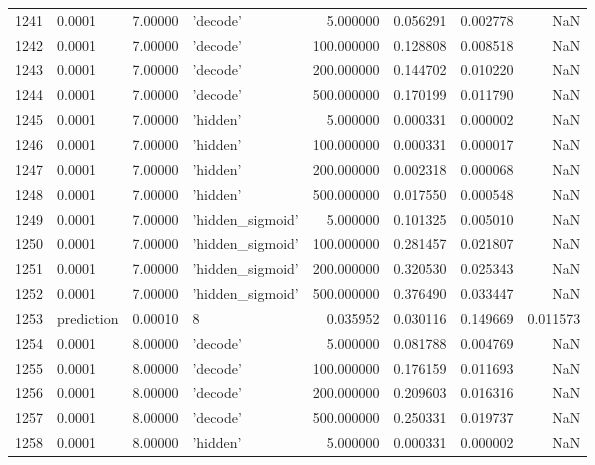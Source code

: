\documentclass[10pt,a4paper]{article}
\begin{document}
\begin{tabular}{llrlrrrr}
1241 &      0.0001 &   7.00000 &           'decode' &    5.000000 &  0.056291 &  0.002778 &       NaN \\
1242 &      0.0001 &   7.00000 &           'decode' &  100.000000 &  0.128808 &  0.008518 &       NaN \\
1243 &      0.0001 &   7.00000 &           'decode' &  200.000000 &  0.144702 &  0.010220 &       NaN \\
1244 &      0.0001 &   7.00000 &           'decode' &  500.000000 &  0.170199 &  0.011790 &       NaN \\
1245 &      0.0001 &   7.00000 &           'hidden' &    5.000000 &  0.000331 &  0.000002 &       NaN \\
1246 &      0.0001 &   7.00000 &           'hidden' &  100.000000 &  0.000331 &  0.000017 &       NaN \\
1247 &      0.0001 &   7.00000 &           'hidden' &  200.000000 &  0.002318 &  0.000068 &       NaN \\
1248 &      0.0001 &   7.00000 &           'hidden' &  500.000000 &  0.017550 &  0.000548 &       NaN \\
1249 &      0.0001 &   7.00000 &   'hidden\_sigmoid' &    5.000000 &  0.101325 &  0.005010 &       NaN \\
1250 &      0.0001 &   7.00000 &   'hidden\_sigmoid' &  100.000000 &  0.281457 &  0.021807 &       NaN \\
1251 &      0.0001 &   7.00000 &   'hidden\_sigmoid' &  200.000000 &  0.320530 &  0.025343 &       NaN \\
1252 &      0.0001 &   7.00000 &   'hidden\_sigmoid' &  500.000000 &  0.376490 &  0.033447 &       NaN \\
1253 &  prediction &   0.00010 &                  8 &    0.035952 &  0.030116 &  0.149669 &  0.011573 \\
1254 &      0.0001 &   8.00000 &           'decode' &    5.000000 &  0.081788 &  0.004769 &       NaN \\
1255 &      0.0001 &   8.00000 &           'decode' &  100.000000 &  0.176159 &  0.011693 &       NaN \\
1256 &      0.0001 &   8.00000 &           'decode' &  200.000000 &  0.209603 &  0.016316 &       NaN \\
1257 &      0.0001 &   8.00000 &           'decode' &  500.000000 &  0.250331 &  0.019737 &       NaN \\
1258 &      0.0001 &   8.00000 &           'hidden' &    5.000000 &  0.000331 &  0.000002 &       NaN \\

\end{tabular}
\end{document}
